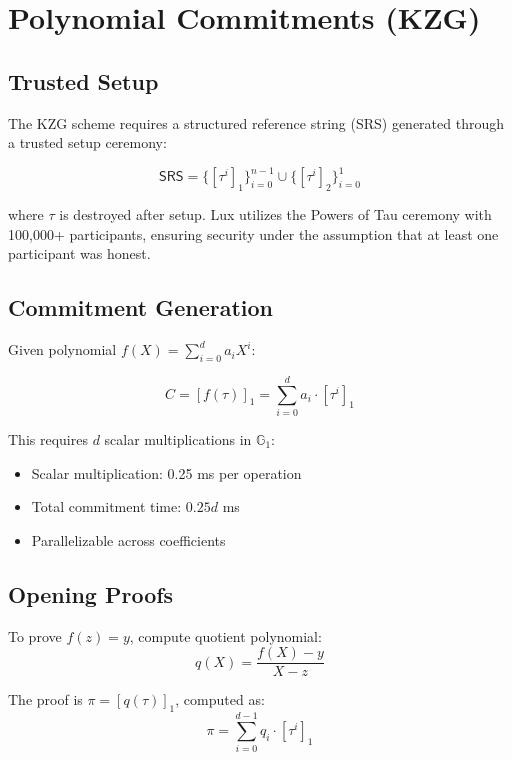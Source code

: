 \section{Polynomial Commitments (KZG)}


\subsection{Trusted Setup}

The KZG scheme requires a structured reference string (SRS) generated through a trusted setup ceremony:

\begin{equation}
    \mathsf{SRS} = \{[\tau^i]_1\}_{i=0}^{n-1} \cup \{[\tau^i]_2\}_{i=0}^{1}
\end{equation}

where $\tau$ is destroyed after setup. Lux utilizes the Powers of Tau ceremony with 100,000+ participants, ensuring security under the assumption that at least one participant was honest.

\subsection{Commitment Generation}

Given polynomial $f(X) = \sum_{i=0}^{d} a_i X^i$:

\begin{equation}
    C = [f(\tau)]_1 = \sum_{i=0}^{d} a_i \cdot [\tau^i]_1
\end{equation}

This requires $d$ scalar multiplications in $\mathbb{G}_1$:
\begin{itemize}
    \item Scalar multiplication: 0.25 ms per operation
    \item Total commitment time: $0.25d$ ms
    \item Parallelizable across coefficients
\end{itemize}

\subsection{Opening Proofs}

To prove $f(z) = y$, compute quotient polynomial:
\begin{equation}
    q(X) = \frac{f(X) - y}{X - z}
\end{equation}

The proof is $\pi = [q(\tau)]_1$, computed as:
\begin{equation}
    \pi = \sum_{i=0}^{d-1} q_i \cdot [\tau^i]_1
\end{equation}

